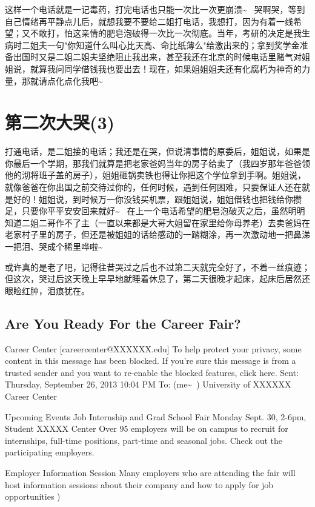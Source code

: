 \documentclass[12pt]{book}
\begin{document}
这样一个电话就是一记毒药，打完电话也只能一次比一次更崩溃\textasciitilde{}~ 哭啊哭，等到自己情绪再平静点儿后，就想我要不要给二姐打电话，我想打，因为有着一线希望；又不敢打，怕这亲情的肥皂泡破得一次比一次彻底。当年，考研的决定是我生病时二姐夫一句"你知道什么叫心比天高、命比纸薄么"给激出来的；拿到奖学金准备出国时又是二姐二姐夫坚绝阻止我出来，甚至我还在北京的时候电话里赌气对姐姐说，就算我问同学借钱我也要出去！现在，如果姐姐姐夫还有化腐朽为神奇的力量，那就请点化点化我吧\textasciitilde{}~　

\section{第二次大哭(3)}
\label{sec-20-3}

打通电话，是二姐接的电话；我还是在哭，但说清事情的原委后，姐姐说，如果是你最后一个学期，那我们就算是把老家爸妈当年的房子给卖了（我四岁那年爸爸领他的沏将班子盖的房子），姐姐砸锅卖铁也得让你把这个学位拿到手啊。姐姐说，就像爸爸在你出国之前交待过你的，任何时候，遇到任何困难，只要保证人还在就是好的！姐姐说，到时候万一你没钱买机票，跟姐姐说，姐姐借钱也把钱给你攒足，只要你平平安安回来就好\textasciitilde{}~ 在上一个电话希望的肥皂泡破灭之后，虽然明明知道二姐二哥作不了主（一直以来都是大哥大姐留在家里给你母养老）去卖爸妈在老家村子里的房子，但还是被姐姐的话给感动的一踏糊涂，再一次激动地一把鼻涕一把泪、哭成个稀里哗啦\textasciitilde{}~

或许真的是老了吧，记得往昔哭过之后也不过第二天就完全好了，不着一丝痕迹；但这次，哭过后这天晚上早早地就睡着休息了，第二天很晚才起床，起床后居然还眼睑红肿，泪痕犹在。

\subsection{Are You Ready For the Career Fair?}
\label{sec-20-3-1}
Career Center [careercenter@XXXXXX.edu]
To help protect your privacy, some content in this message has been blocked. If you're sure this message is from a trusted sender and you want to re-enable the blocked features, click here.
Sent:        Thursday, September 26, 2013 10:04 PM
To:        
(me\textasciitilde{}~)
University of XXXXXX Career Center

Upcoming Events
Job Internship and Grad School Fair
Monday Sept. 30, 
2-6pm, Student XXXXX Center
Over 95 employers will be on campus to recruit for internships, full-time positions, part-time and seasonal jobs. Check out the participating employers.

Employer Information Session
Many employers who are attending the fair will host information sessions about their company and how to apply for job opportunities 
)
\end{document}
